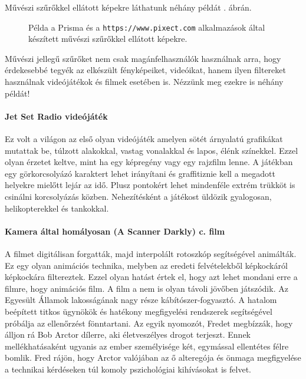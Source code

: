 
Művészi szűrőkkel ellátott képekre láthatunk néhány példát . ábrán.

\begin{figure}[ht]
\centering
{}
\caption{Példa a Prisma és a \texttt{https://www.pixect.com} alkalmazások által készített művészi szűrőkkel ellátott képekre.} 
\label{fig:prisma}
\end{figure}


Művészi jellegű szűrőket nem csak magánfelhasználók használnak arra, hogy érdekesebbé tegyék az elkészült fényképeiket, videóikat, hanem ilyen filtereket használnak videójátékok és filmek esetében is. Nézzünk meg ezekre is néhány példát!

\paragraph{Jet Set Radio videójáték} 

Ez volt a világon az első olyan videójáték amelyen sötét árnyalatú grafikákat mutattak be, túlzott alakokkal, vastag vonalakkal és lapos, élénk színekkel. Ezzel olyan érzetet keltve, mint ha egy képregény vagy egy rajzfilm lenne. A játékban egy görkorcsolyázó karaktert lehet irányítani és graffitiznie kell a megadott helyekre mielőtt lejár az idő. Plusz pontokért lehet mindenféle extrém trükköt is csinálni korcsolyázás közben. Nehezítésként a játékost üldözik gyalogosan, helikopterekkel és tankokkal. %


\paragraph{Kamera által homályosan (A Scanner Darkly) c. film} 

A filmet digitálisan forgatták, majd interpolált rotoszkóp segítségével animálták. Ez egy olyan animációs technika, melyben az eredeti felvételekből képkockáról képkockára filtereztek. Ezzel olyan hatást értek el, hogy azt lehet mondani erre a filmre, hogy animációs film. A film a nem is olyan távoli jövőben játszódik. Az Egyesült Államok lakosságának nagy része kábítószer-fogyasztó. A hatalom beépített titkos ügynökök és hatékony megfigyelési rendszerek segítségével próbálja az ellenőrzést fönntartani. Az egyik nyomozót, Fredet megbízzák, hogy álljon rá Bob Arctor dílerre, aki életveszélyes drogot terjeszt. Ennek mellékhatásaként ugyanis az ember személyisége két, egymással ellentétes félre bomlik. Fred rájön, hogy Arctor valójában az ő alteregója és önmaga megfigyelése a technikai kérdéseken túl komoly pszichológiai kihívásokat is felvet. %

